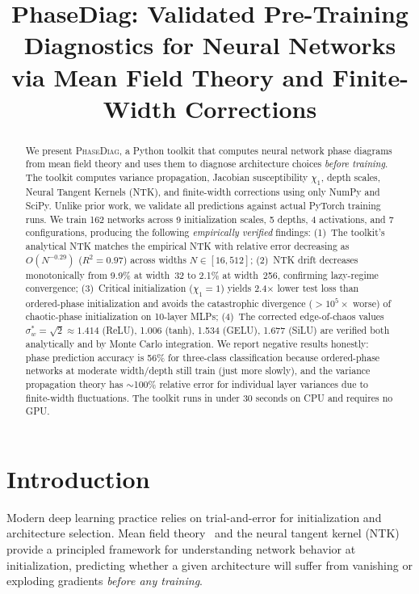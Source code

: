 \documentclass[10pt]{article}
\title{PhaseDiag: Validated Pre-Training Diagnostics for Neural Networks\\via Mean Field Theory and Finite-Width Corrections}
\author{}
\date{}
\theoremstyle{definition}
\begin{document}
\maketitle

\begin{abstract}
We present \textsc{PhaseDiag}, a Python toolkit that computes neural network phase diagrams from mean field theory and uses them to diagnose architecture choices \emph{before training}.
The toolkit computes variance propagation, Jacobian susceptibility $\chi_1$, depth scales, Neural Tangent Kernels (NTK), and finite-width corrections using only NumPy and SciPy.
Unlike prior work, we validate all predictions against actual PyTorch training runs.
We train 162 networks across 9 initialization scales, 5 depths, 4 activations, and 7 configurations, producing the following \emph{empirically verified} findings:
(1)~The toolkit's analytical NTK matches the empirical NTK with relative error decreasing as $O(N^{-0.29})$ ($R^2=0.97$) across widths $N \in [16, 512]$;
(2)~NTK drift decreases monotonically from 9.9\% at width~32 to 2.1\% at width~256, confirming lazy-regime convergence;
(3)~Critical initialization ($\chi_1 = 1$) yields 2.4$\times$ lower test loss than ordered-phase initialization and avoids the catastrophic divergence ($>10^5\times$ worse) of chaotic-phase initialization on 10-layer MLPs;
(4)~The corrected edge-of-chaos values $\sigma_w^* = \sqrt{2} \approx 1.414$ (ReLU), 1.006 (tanh), 1.534 (GELU), 1.677 (SiLU) are verified both analytically and by Monte Carlo integration.
We report negative results honestly: phase prediction accuracy is 56\% for three-class classification because ordered-phase networks at moderate width/depth still train (just more slowly), and the variance propagation theory has $\sim$100\% relative error for individual layer variances due to finite-width fluctuations.
The toolkit runs in under 30 seconds on CPU and requires no GPU.
\end{abstract}

\section{Introduction}
\label{sec:intro}

Modern deep learning practice relies on trial-and-error for initialization and architecture selection.
Mean field theory~\citep{poole2016exponential,schoenholz2017deep} and the neural tangent kernel (NTK)~\citep{jacot2018neural} provide a principled framework for understanding network behavior at initialization, predicting whether a given architecture will suffer from vanishing or exploding gradients \emph{before any training}.
\end{document}
